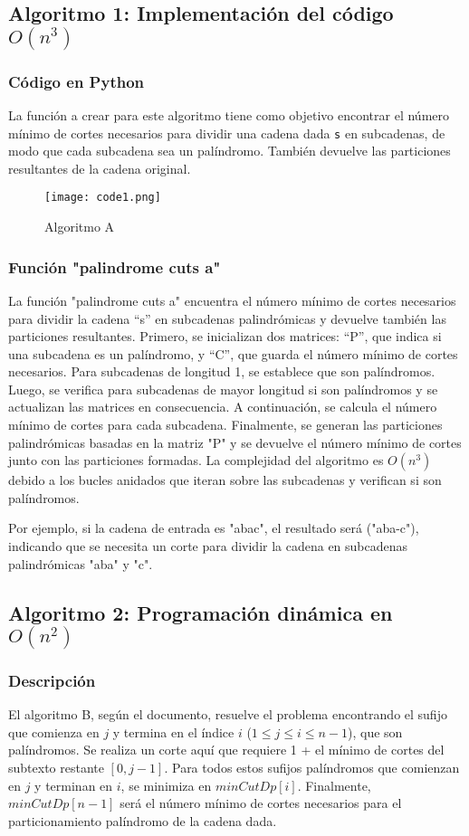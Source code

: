 \documentclass{report}
\begin{document}
\subsection{Algoritmo 1: Implementación del código $O(n^3)$}
\subsubsection{Código en Python}
La función a crear para este algoritmo tiene como objetivo encontrar el número mínimo de cortes necesarios para dividir una cadena dada \verb|s| en subcadenas, de modo que cada subcadena sea un palíndromo. También devuelve las particiones resultantes de la cadena original.

\begin{figure}[htb]
\centering
\texttt{[image: code1.png]}
\caption{Algoritmo A}
\label{fig:tigre}
\end{figure}

\subsubsection{Función "palindrome cuts a"}
La función "palindrome cuts a" encuentra el número mínimo de cortes necesarios para dividir la cadena “s” en subcadenas palindrómicas y devuelve también las particiones resultantes. Primero, se inicializan dos matrices: “P”, que indica si una subcadena es un palíndromo, y “C”, que guarda el número mínimo de cortes necesarios. Para subcadenas de longitud 1, se establece que son palíndromos. Luego, se verifica para subcadenas de mayor longitud si son palíndromos y se actualizan las matrices en consecuencia. A continuación, se calcula el número mínimo de cortes para cada subcadena. Finalmente, se generan las particiones palindrómicas basadas en la matriz "P" y se devuelve el número mínimo de cortes junto con las particiones formadas. La complejidad del algoritmo es $O(n^3)$ debido a los bucles anidados que iteran sobre las subcadenas y verifican si son palíndromos.

Por ejemplo, si la cadena de entrada es "abac", el resultado será ("aba-c"), indicando que se necesita un corte para dividir la cadena en subcadenas palindrómicas "aba" y "c".

\subsection{Algoritmo 2: Programación dinámica en $O(n^2)$}
\subsubsection{Descripción}
El algoritmo B, según el documento, resuelve el problema encontrando el sufijo que comienza en $j$ y termina en el índice $i$ ($1 \leq j \leq i \leq n-1$), que son palíndromos. Se realiza un corte aquí que requiere 1 + el mínimo de cortes del subtexto restante $[0, j-1]$. Para todos estos sufijos palíndromos que comienzan en $j$ y terminan en $i$, se minimiza en $minCutDp[i]$. Finalmente, $minCutDp[n-1]$ será el número mínimo de cortes necesarios para el particionamiento palíndromo de la cadena dada.
\end{document}
